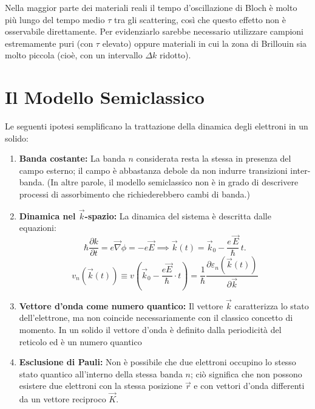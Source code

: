 Nella maggior parte dei materiali reali il tempo d'oscillazione di Bloch è molto più lungo del tempo medio \(\tau\) tra gli scattering, così che questo effetto non è osservabile direttamente. Per evidenziarlo sarebbe necessario utilizzare campioni estremamente puri (con \(\tau\) elevato) oppure materiali in cui la zona di Brillouin sia molto piccola (cioè, con un intervallo \(\Delta k\) ridotto).

\section{Il Modello Semiclassico}
Le seguenti ipotesi semplificano la trattazione della dinamica degli elettroni in un solido:
\begin{enumerate}
    \item \textbf{Banda costante:} La banda \(n\) considerata resta la stessa in presenza del campo esterno; il campo è abbastanza debole da non indurre transizioni inter-banda. (In altre parole, il modello semiclassico non è in grado di descrivere processi di assorbimento che richiederebbero cambi di banda.)
    
    \item \textbf{Dinamica nel \(\vec{k}\)-spazio:} La dinamica del sistema è descritta dalle equazioni:
    \[
    \hbar \frac{\partial k}{\partial t} = e\vec{\nabla}\phi = -e\vec{E} \implies \vec{k}(t) = \vec{k}_0 - \frac{e\,\vec{E}}{\hbar}\, t.
    \]
    \[v_n(\vec{k}(t)) \equiv v\left(\vec{k}_0 -\frac{e\vec{E}}{\hbar}\cdot t \right)  = \frac{1}{\hbar} \frac{\partial \varepsilon_n(\vec{k}(t))}{\partial \vec{k}}\]
    
    \item \textbf{Vettore d'onda come numero quantico:} Il vettore \(\vec{k}\) caratterizza lo stato dell'elettrone, ma non coincide necessariamente con il classico concetto di momento. In un solido il vettore d'onda è definito dalla periodicità del reticolo ed è un numero quantico
    
    \item \textbf{Esclusione di Pauli:} Non è possibile che due elettroni occupino lo stesso stato quantico all'interno della stessa banda \(n\); ciò significa che non possono esistere due elettroni con la stessa posizione \(\vec{r}\) e con vettori d'onda differenti da un vettore reciproco \(\vec{K}\).
    

\end{enumerate}
